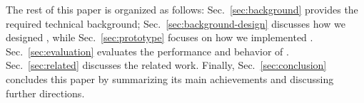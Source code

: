 
The rest of this paper is organized as follows: Sec.~\ref{sec:background}
provides the required technical background; Sec.~\ref{sec:background-design}
discusses how we designed \tcpls, while Sec.~\ref{sec:prototype} focuses on
how we implemented \tcpls. Sec.~\ref{sec:evaluation} evaluates the performance
and behavior of \tcpls. Sec.~\ref{sec:related} discusses the related work.
Finally, Sec.~\ref{sec:conclusion} concludes this paper by
summarizing its main achievements and discussing further directions.
